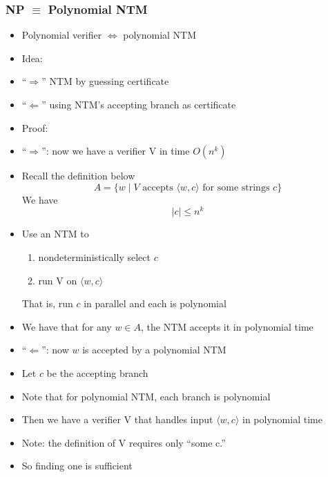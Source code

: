 




\begin{frame}[allowframebreaks] \frametitle{NP $\equiv$ Polynomial NTM}

  \begin{itemize}
\item Polynomial verifier $\Leftrightarrow$ polynomial NTM

\item Idea:

\item [] ``$\Rightarrow$'' NTM by guessing certificate

\item [] ``$\Leftarrow$'' using NTM's accepting branch as  certificate
\item Proof:
\item ``$\Rightarrow$'': now we have a verifier V in time $O(n^k)$

  
\item [] Recall the definition below
    \begin{equation*}
    A=\{w\mid
V \mbox{ accepts } 
\langle  w,c\rangle  
\mbox{ for some strings } c\}
  \end{equation*}
We have
\begin{equation*}
|c|\leq n^k
\end{equation*}
\item Use an NTM to
  \begin{enumerate}
  \item nondeterministically select $c$
  \item run V on $\langle  w,c\rangle $
  \end{enumerate}
That is, run $c$ in parallel and each is polynomial
\item We have that for any $w \in A$, the NTM accepts
  it in polynomial time
\item ``$\Leftarrow$'': now $w$ is accepted by a polynomial NTM
\item [] Let $c$ be the accepting branch
\item [] Note that for polynomial NTM, each branch is polynomial
\item Then we have a verifier V that handles input $\langle  w,c\rangle $
in polynomial time

\item Note: the definition of V requires only ``some c.''
\item So finding one is sufficient

\end{itemize}\end{frame}

